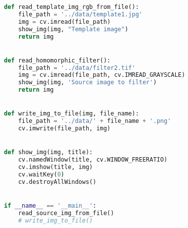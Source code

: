 \documentclass{hitreport}
\begin{document}
\begin{appendices}
\begin{lstlisting}[language=python]
def read_template_img_rgb_from_file():
    file_path = '../data/template1.jpg'
    img = cv.imread(file_path)
    show_img(img, "Template image")
    return img


def read_homomorphic_filter():
    file_path = '../data/filter2.tif'
    img = cv.imread(file_path, cv.IMREAD_GRAYSCALE)
    show_img(img, 'Source image to filter')
    return img


def write_img_to_file(img, file_name):
    file_path = '../data/' + file_name + '.png'
    cv.imwrite(file_path, img)


def show_img(img, title):
    cv.namedWindow(title, cv.WINDOW_FREERATIO)
    cv.imshow(title, img)
    cv.waitKey(0)
    cv.destroyAllWindows()


if __name__ == '__main__':
    read_source_img_from_file()
    # write_img_to_file()


\end{lstlisting}

\end{appendices}
\end{document}
